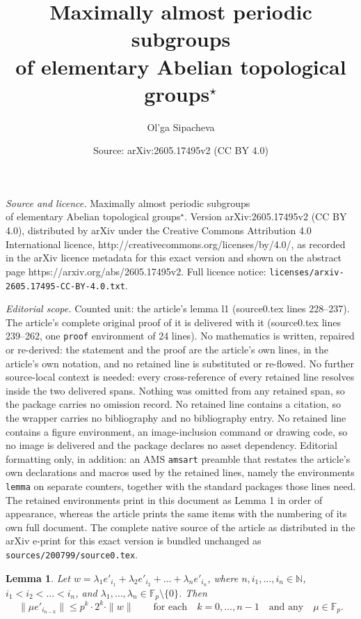 \documentclass[10pt,a4paper]{amsart}
\title{Maximally almost periodic subgroups\\ of elementary Abelian topological groups$^\star$}
\author{Ol'ga Sipacheva}
\date{Source: arXiv:2605.17495v2 (CC BY 4.0)}
\newtheorem{lemma}{Lemma}
\begin{document}
\maketitle

\noindent\emph{Source and licence.} Maximally almost periodic subgroups\\ of elementary Abelian topological groups$^\star$. Version arXiv:2605.17495v2 (CC BY 4.0), distributed by arXiv under the Creative Commons Attribution 4.0 International licence, http://creativecommons.org/licenses/by/4.0/, as recorded in the arXiv licence metadata for this exact version and shown on the abstract page https://arxiv.org/abs/2605.17495v2. Full licence notice: \texttt{licenses/arxiv-2605.17495-CC-BY-4.0.txt}.\par\smallskip

\noindent\textit{Editorial scope.} Counted unit: the article's lemma l1 (source0.tex lines 228--237). The article's complete original proof of it is delivered with it (source0.tex lines 239--262, one \texttt{proof} environment of 24 lines). No mathematics is written, repaired or re-derived: the statement and the proof are the article's own lines, in the article's own notation, and no retained line is substituted or re-flowed.  No further source-local context is needed: every cross-reference of every retained line resolves inside the two delivered spans.  Nothing was omitted from any retained span, so the package carries no omission record.  No retained line contains a citation, so the wrapper carries no bibliography and no bibliography entry.  No retained line contains a figure environment, an image-inclusion command or drawing code, so no image is delivered and the package declares no asset dependency.  Editorial formatting only, in addition: an AMS \texttt{amsart} preamble that restates the article's own declarations and macros used by the retained lines, namely the environments \texttt{lemma} on separate counters, together with the standard packages those lines need.  The retained environments print in this document as Lemma 1 in order of appearance, whereas the article prints the same items with the numbering of its own full document.  The complete native source of the article as distributed in the arXiv e-print for this exact version is bundled unchanged as \texttt{sources/200799/source0.tex}.
\begin{lemma}
\label{l1}
Let $w=\lambda_1 e'_{i_1} + \lambda_2 e'_{i_2} +\dots + \lambda_n e'_{i_n}$\textup, 
where $n, i_1, \dots, i_n\in \mathbb N$\textup, $i_1< i_2< \dots < i_n$\textup, and $\lambda_1, \dots, 
\lambda_n\in \mathbb F_p\setminus \{0\}$\textup. Then 
$$ 
\|\mu e'_{i_{n-k}}\|\le p^k\cdot 2^k\cdot \|w\|\qquad \text{for each}\quad k=0, \dots, n-1\quad \text{and 
any}\quad \mu\in \mathbb F_p. 
$$ 
\end{lemma}
\end{document}
